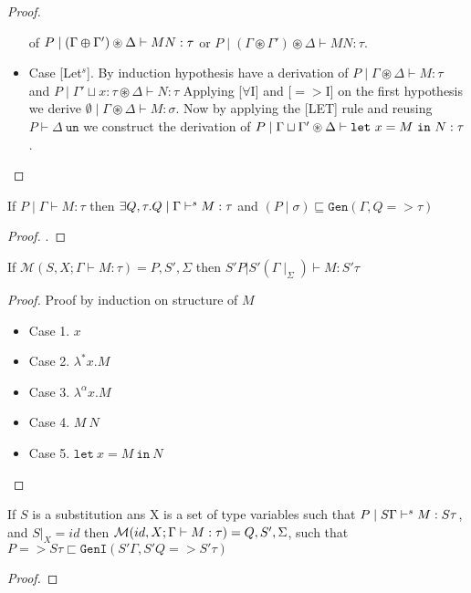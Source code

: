\begin{proof}
\begin{itemize}
    of $P \mid (\Gamma \varoplus \Gamma') \circledast \Delta \vdash M N:\tau$ or $P \mid (\Gamma \circledast \Gamma') \circledast \Delta \vdash M N:\tau$.
  \item{Case [Let$^s$].}
    By induction hypothesis have a derivation of $P \mid \Gamma \circledast \Delta \vdash M: \tau$ and $P \mid \Gamma' \sqcup x:\tau \circledast \Delta \vdash N:\tau$
    Applying [$\forall$I] and [$=>$I] on the first hypothesis we derive $\emptyset \mid \Gamma \circledast \Delta \vdash M: \sigma$. Now by applying
    the [LET] rule and reusing $P \vdash \Delta\ \texttt{un}$ we construct the derivation of
    $P \mid \Gamma \sqcup \Gamma' \circledast \Delta \vdash \texttt{let}\ x = M\ \texttt{in}\ N:\tau$.
  \end{itemize}
\end{proof}

\begin{thm}\label{thm:completeness-syntax-directed}
  If $P \mid \Gamma \vdash M:\tau$ then
  $\exists Q,\tau. Q \mid \Gamma \vdash^s M:\tau$
  and $(P \mid \sigma) \sqsubseteq \texttt{Gen}(\Gamma, Q => \tau)$
\end{thm}
\begin{proof}
  .
\end{proof}

\begin{thm}
   If $\mathcal{M}(S, X; \Gamma \vdash M : \tau) = P, S', \Sigma$ then $S' P | S' (\Gamma\mid_{\Sigma}) \vdash M : S' \tau$
\end{thm}
\begin{proof}
  Proof by induction on structure of $M$
  \begin{itemize}
  \item Case 1. $x$
  \item Case 2. $\lambda^{*} x. M$
  \item Case 3. $\lambda ^{\alpha}x. M$
  \item Case 4. $M\ N$
  \item Case 5. $\texttt{let}\ x = M\ \texttt{in}\ N$
  \end{itemize}
\end{proof}

\begin{thm}[Completeness of $\M$.]
  If $S$ is a substitution ans X is a set of type variables such that
  $P \mid S\Gamma \vdash^s M: S\tau$, and $S|_X = id$ then $\mathcal{M}(id, X; \Gamma \vdash M:\tau) = Q, S', \Sigma$, such that
  $P => S\tau \sqsubset \texttt{GenI}(S'\Gamma, S' Q => S' \tau)$
\end{thm}
\begin{proof}
\end{proof}

